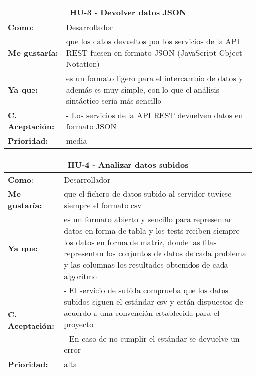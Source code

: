 
\begin{table}[H]
	\begin{tabular}{| p{3cm}| p{11cm} |}
		\hline
		\multicolumn{2}{|c|}{\textbf{HU-3} - Devolver datos JSON} \\ \hline
		\textbf{Como:} & Desarrollador \\ \hline
		\textbf{Me gustaría:} & que los datos devueltos por los servicios de la API REST fuesen en formato JSON (JavaScript Object Notation) \\ \hline
		\textbf{Ya que:} & es un formato ligero para el intercambio de datos y además es muy simple, con lo que el análisis sintáctico sería más sencillo \\ \hline
		\textbf{C. Aceptación:} & - Los servicios de la API REST devuelven datos en formato JSON \\ \hline
		\textbf{\textbf{Prioridad:}} & media \\ \hline
	\end{tabular}
\end{table}


\begin{table}[H]
	\begin{tabular}{| p{3cm}| p{11cm} |}
		\hline
		\multicolumn{2}{|c|}{\textbf{HU-4} - Analizar datos subidos} \\ \hline
		\textbf{Como:} & Desarrollador \\ \hline
		\textbf{Me gustaría:} & que el fichero de datos subido al servidor tuviese siempre el formato csv \\ \hline
		\textbf{Ya que:} & es un formato abierto y sencillo para representar datos en forma de tabla y los tests reciben siempre los datos en forma de matriz, donde las filas representan los conjuntos de datos de cada problema y las columnas los resultados obtenidos de cada algoritmo \\ \hline
		\multirow{2}{11cm}{\textbf{C. Aceptación:}} & - El servicio de subida comprueba que los datos subidos siguen el estándar csv y están dispuestos de acuerdo a una convención establecida para el proyecto \\
		& - En caso de no cumplir el estándar se devuelve un error \\ \hline 
		\textbf{\textbf{Prioridad:}} & alta \\ \hline
	\end{tabular}
\end{table}
	
